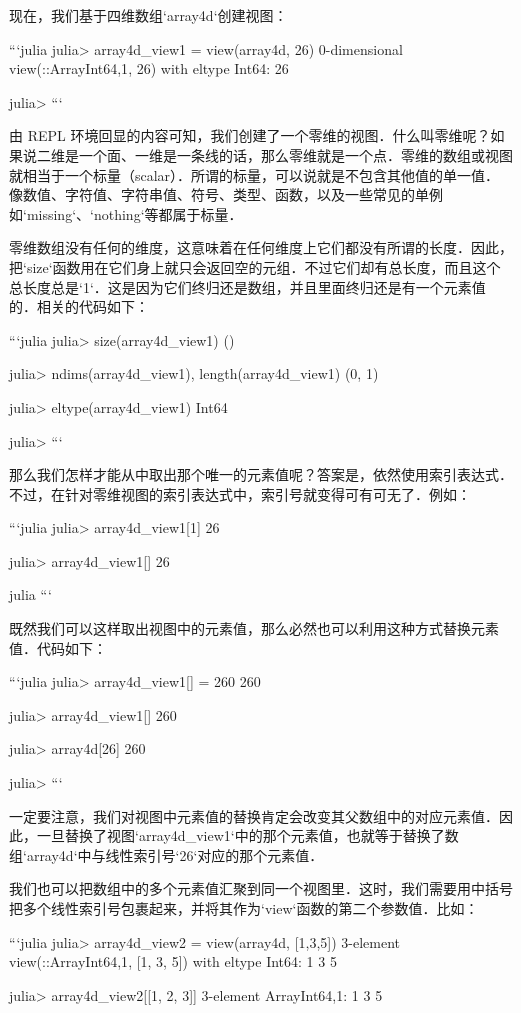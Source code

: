 现在，我们基于四维数组`array4d`创建视图：

```julia
julia> array4d_view1 = view(array4d, 26)
0-dimensional view(::Array{Int64,1}, 26) with eltype Int64:
26

julia> 
```

由 REPL 环境回显的内容可知，我们创建了一个零维的视图．什么叫零维呢？如果说二维是一个面、一维是一条线的话，那么零维就是一个点．零维的数组或视图就相当于一个标量（scalar）．所谓的标量，可以说就是不包含其他值的单一值．像数值、字符值、字符串值、符号、类型、函数，以及一些常见的单例如`missing`、`nothing`等都属于标量．

零维数组没有任何的维度，这意味着在任何维度上它们都没有所谓的长度．因此，把`size`函数用在它们身上就只会返回空的元组．不过它们却有总长度，而且这个总长度总是`1`．这是因为它们终归还是数组，并且里面终归还是有一个元素值的．相关的代码如下：

```julia
julia> size(array4d_view1)
()

julia> ndims(array4d_view1), length(array4d_view1)
(0, 1)

julia> eltype(array4d_view1)
Int64

julia> 
```

那么我们怎样才能从中取出那个唯一的元素值呢？答案是，依然使用索引表达式．不过，在针对零维视图的索引表达式中，索引号就变得可有可无了．例如：

```julia
julia> array4d_view1[1]
26

julia> array4d_view1[]
26

julia
```

既然我们可以这样取出视图中的元素值，那么必然也可以利用这种方式替换元素值．代码如下：

```julia
julia> array4d_view1[] = 260
260

julia> array4d_view1[]
260

julia> array4d[26]
260

julia> 
```

一定要注意，我们对视图中元素值的替换肯定会改变其父数组中的对应元素值．因此，一旦替换了视图`array4d_view1`中的那个元素值，也就等于替换了数组`array4d`中与线性索引号`26`对应的那个元素值．

我们也可以把数组中的多个元素值汇聚到同一个视图里．这时，我们需要用中括号把多个线性索引号包裹起来，并将其作为`view`函数的第二个参数值．比如：

```julia
julia> array4d_view2 = view(array4d, [1,3,5])
3-element view(::Array{Int64,1}, [1, 3, 5]) with eltype Int64:
 1
 3
 5

julia> array4d_view2[[1, 2, 3]]
3-element Array{Int64,1}:
 1
 3
 5

